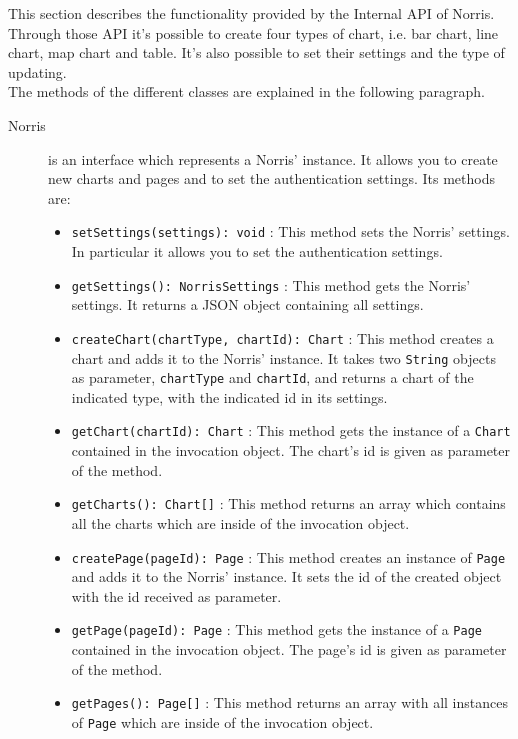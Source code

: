  \label{sec:InternalAPI}
	This section describes the functionality provided by the Internal API of Norris. Through those API it's possible to create four types of chart, i.e. bar chart, line chart, map chart and table. It's also possible to set their settings and the type of updating.\\ The methods of the different classes are explained in the following paragraph.
	\begin{description}
	\item[Norris] is an interface which represents a Norris' instance. It allows you to create new charts and pages and to set the authentication settings. Its methods are:
		\begin{itemize}
		\item \texttt{setSettings(settings): void} : This method sets the Norris' settings. In particular it allows you to set the authentication settings.
		\item \texttt{getSettings(): NorrisSettings} : This method gets the Norris' settings. It returns a JSON object containing all settings.
		\item \texttt{createChart(chartType, chartId): Chart} : This method creates a chart and adds it to the Norris' instance. It takes two \texttt{String} objects as parameter, \texttt{chartType} and \texttt{chartId}, and returns a chart of the indicated type, with the indicated id in its settings.
		\item \texttt{getChart(chartId): Chart} : This method gets the instance of a \texttt{Chart} contained in the invocation object. The chart's id is given as parameter of the method.
		\item \texttt{getCharts(): Chart[]} : This method returns an array which contains all the charts which are inside of the invocation object.
		\item \texttt{createPage(pageId): Page} : This method creates an instance of \texttt{Page} and adds it to the Norris' instance. It sets the id of the created object with the id received as parameter.
		\item \texttt{getPage(pageId): Page} : This method gets the instance of a \texttt{Page} contained in the invocation object. The page's id is given as parameter of the method.
		\item \texttt{getPages(): Page[]} : This method returns an array with all instances of \texttt{Page} which are inside of the invocation object.
		

\end{itemize}
\end{description}
